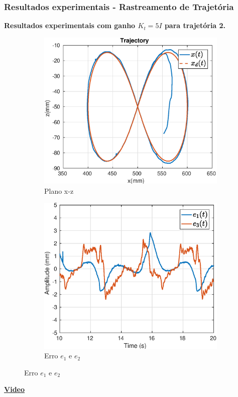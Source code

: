 \documentclass{beamer}
\begin{document}
\begin{frame}
\frametitle{Resultados experimentais - Rastreamento de Trajetória}
\textbf{Resultados experimentais com ganho $K_t = 5 I$ para trajetória 2.}
\begin{figure}[H]
\centering
\begin{subfigure}{.5\textwidth}
  \centering
  \includegraphics[width=\linewidth]{./img/traj_2_k5/traj.eps}
  \caption{Plano x-z}
\end{subfigure}%
\begin{subfigure}{.5\textwidth}
  \centering
  \includegraphics[width=\linewidth]{./img/traj_2_k5/error.eps}
  \caption{Erro $e_1$ e $e_2$}
\end{subfigure}
\end{figure}%
\begin{center}
\href{run:traject2.mp4}{\textbf{Video}}%
\end{center}
\end{frame}
\end{document}
